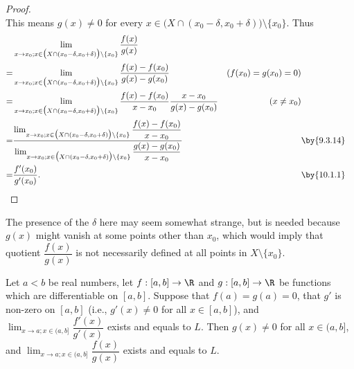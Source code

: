\begin{proof}
\[  \]
  This means \(g(x) \neq 0\) for every \(x \in \big(X \cap (x_0 - \delta, x_0 + \delta)\big) \setminus \{x_0\}\).
  Thus
  \begin{align*}
      & \lim_{x \to x_0 ; x \in \big(X \cap (x_0 - \delta, x_0 + \delta)\big) \setminus \{x_0\}} \dfrac{f(x)}{g(x)}                                                                                                                                                                                    \\
    = & \lim_{x \to x_0 ; x \in \big(X \cap (x_0 - \delta, x_0 + \delta)\big) \setminus \{x_0\}} \dfrac{f(x) - f(x_0)}{g(x) - g(x_0)}                                                                                                                            & (f(x_0) = g(x_0) = 0)               \\
    = & \lim_{x \to x_0 ; x \in \big(X \cap (x_0 - \delta, x_0 + \delta)\big) \setminus \{x_0\}} \dfrac{f(x) - f(x_0)}{x - x_0} \dfrac{x - x_0}{g(x) - g(x_0)}                                                                                                   & (x \neq x_0)                        \\
    = & \dfrac{\lim_{x \to x_0 ; x \in \big(X \cap (x_0 - \delta, x_0 + \delta)\big) \setminus \{x_0\}} \dfrac{f(x) - f(x_0)}{x - x_0}}{\lim_{x \to x_0 ; x \in \big(X \cap (x_0 - \delta, x_0 + \delta)\big) \setminus \{x_0\}} \dfrac{g(x) - g(x_0)}{x - x_0}} &                       & \by{9.3.14} \\
    = & \dfrac{f'(x_0)}{g'(x_0)}.                                                                                                                                                                                                                                &                       & \by{10.1.1}
  \end{align*}
\end{proof}

\begin{note}
  The presence of the \(\delta\) here may seem somewhat strange, but is needed because \(g(x)\) might vanish at some points other than \(x_0\), which would imply that quotient \(\dfrac{f(x)}{g(x)}\) is not necessarily defined at all points in \(X \setminus \{x_0\}\).
\end{note}

\begin{prop}\label{10.5.2}
  Let \(a < b\) be real numbers, let \(f : [a, b] \to \R\) and \(g : [a, b] \to \R\) be functions which are differentiable on \([a, b]\).
  Suppose that \(f(a) = g(a) = 0\), that \(g'\) is non-zero on \([a, b]\) (i.e., \(g'(x) \neq 0\) for all \(x \in [a, b]\)), and \(\lim_{x \to a ; x \in (a, b]} \dfrac{f'(x)}{g'(x)}\) exists and equals to \(L\).
  Then \(g(x) \neq 0\) for all \(x \in (a, b]\), and \(\lim_{x \to a ; x \in (a, b]} \dfrac{f(x)}{g(x)}\) exists and equals to \(L\).
\end{prop}

